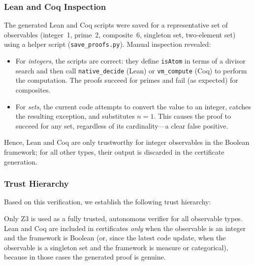\subsubsection{Lean and Coq Inspection}
The generated Lean and Coq scripts were saved for a representative set of
observables (integer~1, prime~2, composite~6, singleton set, two‑element set)
using a helper script (\texttt{save\_proofs.py}).  Manual inspection revealed:
\begin{itemize}
    \item For \emph{integers}, the scripts are correct: they define
          \texttt{isAtom} in terms of a divisor search and then call
          \texttt{native\_decide} (Lean) or \texttt{vm\_compute} (Coq) to
          perform the computation.  The proofs succeed for primes and fail
          (as expected) for composites.
    \item For \emph{sets}, the current code attempts to convert the value to
          an integer, catches the resulting exception, and substitutes
          $n=1$.  This causes the proof to succeed for any set, regardless
          of its cardinality—a clear false positive.
\end{itemize}
Hence, Lean and Coq are only trustworthy for integer observables in the
Boolean framework; for all other types, their output is discarded in the
certificate generation.

\subsubsection{Trust Hierarchy}
Based on this verification, we establish the following trust hierarchy:
\begin{center}
\end{center}
Only Z3 is used as a fully trusted, autonomous verifier for all observable
types.  Lean and Coq are included in certificates \emph{only} when the
observable is an integer and the framework is Boolean (or, since the
latest code update, when the observable is a singleton set and the
framework is measure or categorical), because in those cases the
generated proof is genuine.

